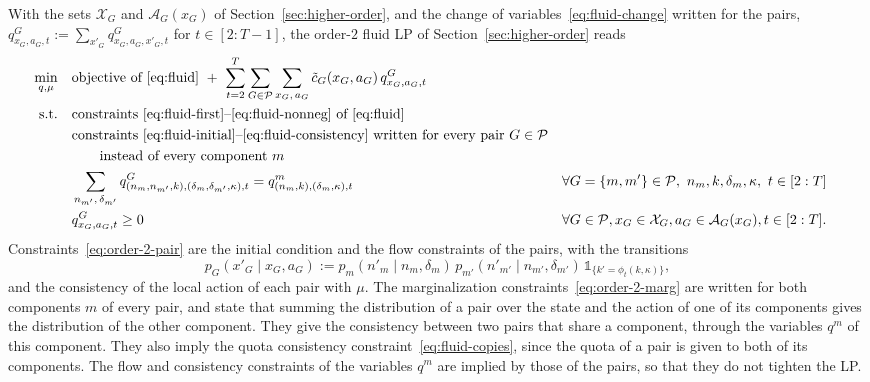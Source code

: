 \documentclass{article}
\begin{document}
With the sets $\mathcal{X}_G$ and $\mathcal{A}_G(x_G)$ of Section~\ref{sec:higher-order}, and the change of
variables~\eqref{eq:fluid-change}
written for the pairs, $q^G_{x_G,a_G,t} := \sum_{x'_G}
q^G_{x_G,a_G,x'_G,t}$ for $t \in [2:T-1]$, the order-$2$ fluid LP of
Section~\ref{sec:higher-order} reads
\begin{subequations}\label{eq:order-2}
\begin{align}
\min_{q,\mu} \quad
& \text{objective of~\eqref{eq:fluid}} \ +\ \sum_{t=2}^{T} \sum_{G \in \mathcal{P}} \sum_{x_G,\, a_G} \tilde
c_G(x_G,a_G)\, q^G_{x_G,a_G,t}
\label{eq:order-2-obj}\\
\text{s.t.} \quad
& \text{constraints~\eqref{eq:fluid-first}--\eqref{eq:fluid-nonneg} of~\eqref{eq:fluid}}
\label{eq:order-2-fluid}\\
& \text{constraints~\eqref{eq:fluid-initial}--\eqref{eq:fluid-consistency} written for every pair } G \in \mathcal{P}
\nonumber\\
& \qquad \text{instead of every component } m
\label{eq:order-2-pair}\\
& \sum_{n_{m'},\, \delta_{m'}} q^G_{(n_m, n_{m'}, k),(\delta_m, \delta_{m'}, \kappa),t} = q^m_{(n_m,k),(\delta_m,\kappa),t}
&& \forall G = \{m, m'\} \in \mathcal{P},\ n_m, k, \delta_m, \kappa,\ t \in [2:T]
\label{eq:order-2-marg}\\
& q^G_{x_G,a_G,t} \ge 0
&& \forall G \in \mathcal{P}, x_G \in \mathcal{X}_G, a_G \in \mathcal{A}_G(x_G), t \in [2:T].
\label{eq:order-2-nonneg}
\end{align}
\end{subequations}
Constraints~\eqref{eq:order-2-pair} are the initial condition and the flow constraints of the pairs, with the
transitions
\[
p_G(x'_G \mid x_G, a_G) := p_m(n'_m \mid n_m, \delta_m)\, p_{m'}(n'_{m'} \mid n_{m'}, \delta_{m'})\,
\mathds{1}_{\{k' = \phi_t(k, \kappa)\}},
\]
and the consistency of the local action of each pair with $\mu$. The marginalization
constraints~\eqref{eq:order-2-marg} are written for both components $m$ of every pair, and state that summing the
distribution of a pair over the state and the action of one of its components gives the distribution of the other
component. They give the consistency between two pairs that share a component, through the variables $q^m$ of this
component. They also imply the quota consistency constraint~\eqref{eq:fluid-copies}, since the quota of a pair is given
to both of its components. The flow and consistency constraints of the variables $q^m$ are implied by those of the
pairs, so that they do not tighten the LP.
\end{document}
